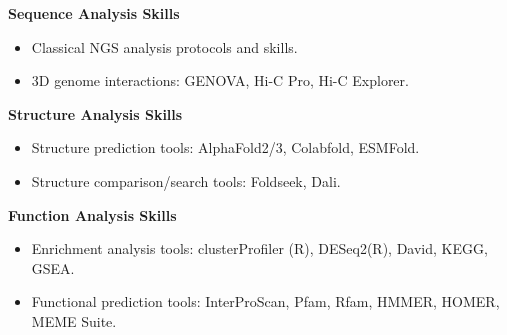 \textbf{Sequence Analysis Skills}
\begin{itemize}
    \item Classical NGS analysis protocols and skills.
    \item 3D genome interactions: GENOVA, Hi-C Pro, Hi-C Explorer.
\end{itemize}

\textbf{Structure Analysis Skills}
\begin{itemize}
    \item Structure prediction tools: AlphaFold2/3, Colabfold, ESMFold.
    \item Structure comparison/search tools: Foldseek, Dali.
\end{itemize}

\textbf{Function Analysis Skills}
\begin{itemize}
    \item Enrichment analysis tools: clusterProfiler (R), DESeq2(R), David, KEGG, GSEA.
    \item Functional prediction tools: InterProScan, Pfam, Rfam, HMMER, HOMER, MEME Suite.
\end{itemize}




  
  
